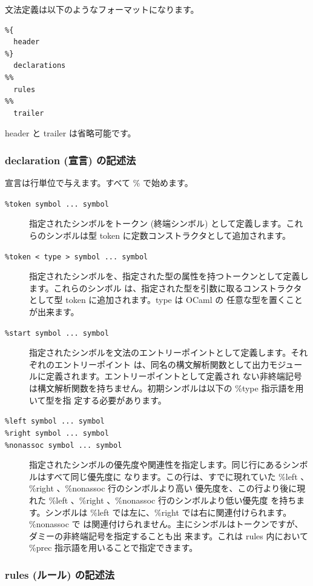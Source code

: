\documentclass[a4paper,11pt]{jsarticle}
\begin{document}
文法定義は以下のようなフォーマットになります。

\begin{lstlisting}
%{
  header
%}
  declarations
%%
  rules
%%
  trailer
\end{lstlisting}

header と trailer は省略可能です。

\subsubsection{declaration (宣言) の記述法}

宣言は行単位で与えます。すべて \% で始めます。

\begin{description}
\item [\texttt{\%token symbol ...  symbol}]
  指定されたシンボルをトークン (終端シンボル) として定義します。これらのシンボルは型 token
  に定数コンストラクタとして追加されます。
\item [\texttt{\%token < type >  symbol ...  symbol}]
  指定されたシンボルを、指定された型の属性を持つトークンとして定義します。これらのシンボル
  は、指定された型を引数に取るコンストラクタとして型 token に追加されます。type は OCaml の
  任意な型を置くことが出来ます。
\item[\texttt{\%start symbol ...  symbol}]
  指定されたシンボルを文法のエントリーポイントとして定義します。それぞれのエントリーポイント
  は、同名の構文解析関数として出力モジュールに定義されます。エントリーポイントとして定義され
  ない非終端記号は構文解析関数を持ちません。初期シンボルは以下の \%type 指示語を用いて型を指
  定する必要があります。
\item[\texttt{\%left symbol ...  symbol}]
\item[\texttt{\%right symbol ...  symbol}]
\item[\texttt{\%nonassoc symbol ...  symbol}]
  指定されたシンボルの優先度や関連性を指定します。同じ行にあるシンボルはすべて同じ優先度に
  なります。この行は、すでに現れていた \%left 、\%right 、\%nonassoc 行のシンボルより高い
  優先度を、この行より後に現れた \%left 、\%right 、\%nonassoc 行のシンボルより低い優先度
  を持ちます。シンボルは \%left では左に、\%right では右に関連付けられます。\%nonassoc で
  は関連付けられません。主にシンボルはトークンですが、ダミーの非終端記号を指定することも出
  来ます。これは rules 内において \%prec 指示語を用いることで指定できます。
\end{description}

\subsubsection{rules (ルール) の記述法}
\end{document}
